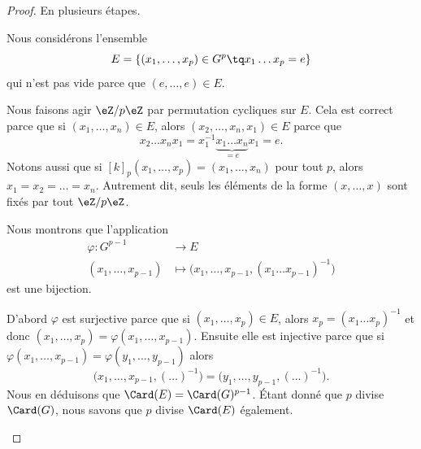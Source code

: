 \begin{proof}
	En plusieurs étapes.
	\begin{subproof}

		Nous considérons l'ensemble
		\begin{equation}
			E=\{ (x_1,\ldots,x_p)\in G^p\tq x_1\ldots x_p=e \}
		\end{equation}
		qui n'est pas vide parce que \( (e,\ldots,e)\in E\).

		Nous faisons agir \( \eZ/p\eZ\) par permutation cycliques sur \( E\). Cela est correct parce que si \( (x_1,\ldots,x_n)\in E\), alors \( (x_2,\ldots,x_n,x_1)\in E\) parce que
		\begin{equation}
			x_2\ldots x_nx_1=x_1^{-1}\underbrace{x_1\ldots x_n}_{=e}x_1=e.
		\end{equation}
		Notons aussi que si \( [k]_p(x_1,\ldots,x_p)=(x_1,\ldots,x_n)\) pour tout \( p\), alors \( x_1=x_2=\ldots =x_n\). Autrement dit, seuls les éléments de la forme \( (x,\ldots,x) \) sont fixés par tout \( \eZ/p\eZ\).

		\spitem[\( \Card(E)=\Card(G)^{p-1}\)]
		Nous montrons que l'application
		\begin{equation}
			\begin{aligned}
				\varphi\colon G^{p-1} & \to E                                                            \\
				(x_1,\ldots,x_{p-1})  & \mapsto \big( x_1,\ldots,x_{p-1}, (x_1\ldots x_{p-1})^{-1} \big)
			\end{aligned}
		\end{equation}
		est une bijection.

		D'abord \( \varphi\) est surjective parce que si \( (x_1,\ldots,x_p)\in E\), alors \( x_p=(x_1\ldots x_p)^{-1}\) et donc \( (x_1,\ldots,x_p)=\varphi(x_1,\ldots,x_{p-1})\). Ensuite elle est injective parce que si \( \varphi(x_1,\ldots,x_{p-1})=\varphi(y_1,\ldots,y_{p-1})\) alors
		\begin{equation}
			\big( x_1,\ldots,x_{p-1},(\ldots)^{-1} \big)=\big( y_1,\ldots,y_{p-1},(\ldots)^{-1} \big).
		\end{equation}
		Nous en déduisons que \( \Card(E)=\Card(G)^{p-1}\). Étant donné que \( p\) divise \( \Card(G)\), nous savons que \( p\) divise \( \Card(E)\) également.


\end{subproof}
\end{proof}

